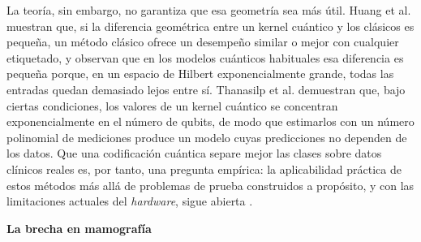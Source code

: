 La teoría, sin embargo, no garantiza que esa geometría sea más útil. Huang et al.
\cite{huang2021power} muestran que, si la diferencia geométrica entre un kernel cuántico y los
clásicos es pequeña, un método clásico ofrece un desempeño similar o mejor con cualquier
etiquetado, y observan que en los modelos cuánticos habituales esa diferencia es pequeña porque,
en un espacio de Hilbert exponencialmente grande, todas las entradas quedan demasiado lejos entre
sí. Thanasilp et al. \cite{Thanasilp2024} demuestran que, bajo ciertas condiciones, los valores de
un kernel cuántico se concentran exponencialmente en el número de qubits, de modo que estimarlos
con un número polinomial de mediciones produce un modelo cuyas predicciones no dependen de los
datos. Que una codificación cuántica separe mejor las clases sobre datos clínicos reales es, por
tanto, una pregunta empírica: la aplicabilidad práctica de estos métodos más allá de problemas de
prueba construidos a propósito, y con las limitaciones actuales del \textit{hardware}, sigue
abierta \cite{AlvarezEstevez2024QuantumKernelBench}.

\textbf{La brecha en mamografía}

